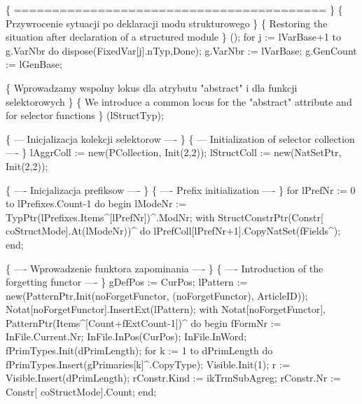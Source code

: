    \{ ========================================= \}
   \{ Przywrocenie sytuacji po deklaracji modu strukturowego \}
   \{ Restoring the situation after declaration of a structured module \}
   ();
   for j := lVarBase+1 to g.VarNbr do dispose(FixedVar[j].nTyp,Done);
   g.VarNbr := lVarBase; g.GenCount := lGenBase;
   
   \{ Wprowadzamy wspolny lokus dla atrybutu "abstract"
     i dla funkcji selektorowych \}
   \{ We introduce a common locus for the "abstract"
     attribute and for selector functions \}
   (lStructTyp);
   
   \{ --- Inicjalizacja kolekcji selektorow ---- \}
   \{ --- Initialization of selector collection ---- \}
   lAggrColl := new(PCollection, Init(2,2));
   lStructColl := new(NatSetPtr, Init(2,2));
   
   \{ ---- Inicjalizacja prefiksow ---- \}
   \{ ---- Prefix initialization ---- \}
   for lPrefNr := 0 to lPrefixes.Count-1 do
   begin
      lModeNr :=  TypPtr(lPrefixes.Items^[lPrefNr])^.ModNr;
      with StructConstrPtr(Constr[ coStructMode].At(lModeNr))^ do
         lPrefColl[lPrefNr+1].CopyNatSet(fFields^);
   end;
   
   \{ ---- Wprowadzenie funktora zapominania ---- \}
   \{ ---- Introduction of the forgetting functor ---- \}
   gDefPos := CurPos;
   lPattern := new(PatternPtr,Init(noForgetFunctor, (noForgetFunctor),
                                   ArticleID));
   Notat[noForgetFunctor].InsertExt(lPattern);
   with Notat[noForgetFunctor], PatternPtr(Items^[Count+fExtCount-1])^ do
   begin
      fFormNr := InFile.Current.Nr; InFile.InPos(CurPos); InFile.InWord;
      fPrimTypes.Init(dPrimLength);
      for k := 1 to dPrimLength do
         fPrimTypes.Insert(gPrimaries[k]^.CopyType);
      Visible.Init(1); r := Visible.Insert(dPrimLength);
      rConstr.Kind := ikTrmSubAgreg;
      rConstr.Nr :=  Constr[ coStructMode].Count;
   end;
   
